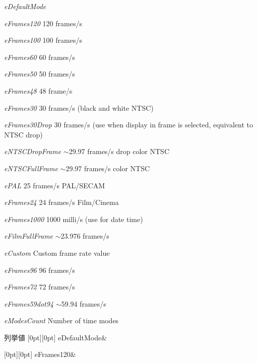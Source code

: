 \begin{DoxyItemize}
\item {\itshape e\+Default\+Mode} 
\item {\itshape e\+Frames120} 120 frames/s
\item {\itshape e\+Frames100} 100 frames/s
\item {\itshape e\+Frames60} 60 frames/s
\item {\itshape e\+Frames50} 50 frames/s
\item {\itshape e\+Frames48} 48 frame/s
\item {\itshape e\+Frames30} 30 frames/s (black and white N\+T\+SC)
\item {\itshape e\+Frames30\+Drop} 30 frames/s (use when display in frame is selected, equivalent to N\+T\+SC drop)
\item {\itshape e\+N\+T\+S\+C\+Drop\+Frame} $\sim$29.97 frames/s drop color N\+T\+SC
\item {\itshape e\+N\+T\+S\+C\+Full\+Frame} $\sim$29.97 frames/s color N\+T\+SC
\item {\itshape e\+P\+AL} 25 frames/s P\+A\+L/\+S\+E\+C\+AM
\item {\itshape e\+Frames24} 24 frames/s Film/\+Cinema
\item {\itshape e\+Frames1000} 1000 milli/s (use for date time)
\item {\itshape e\+Film\+Full\+Frame} $\sim$23.976 frames/s
\item {\itshape e\+Custom} Custom frame rate value
\item {\itshape e\+Frames96} 96 frames/s
\item {\itshape e\+Frames72} 72 frames/s
\item {\itshape e\+Frames59dot94} $\sim$59.94 frames/s
\item {\itshape e\+Modes\+Count} Number of time modes 
\end{DoxyItemize}\begin{DoxyEnumFields}{列挙値}
[0pt][0pt]{}\mbox{\label{class_fbx_time_acc529b00a0e8d4c3da3702449ca93031a1490a2efc4429bf125761d75f2aa06a6}} 
e\+Default\+Mode&\\
\hline

[0pt][0pt]{}\mbox{\label{class_fbx_time_acc529b00a0e8d4c3da3702449ca93031ad99207ac9510b531da3c8a13408b2631}} 
e\+Frames120&\\
\hline


\end{DoxyEnumFields}
